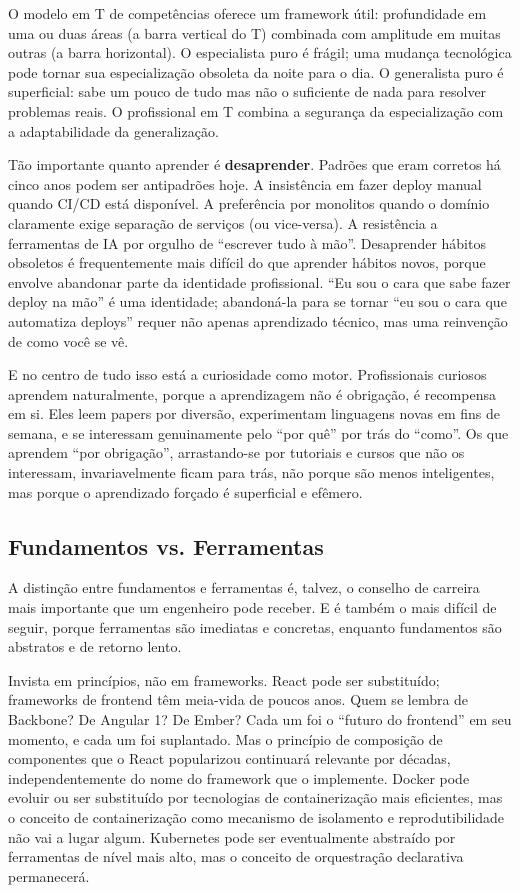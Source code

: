 O modelo em T de competências oferece um framework útil: profundidade
em uma ou duas áreas (a barra vertical do T) combinada com amplitude
em muitas outras (a barra horizontal). O especialista puro é frágil;
uma mudança tecnológica pode tornar sua especialização obsoleta da
noite para o dia. O generalista puro é superficial: sabe um pouco
de tudo mas não o suficiente de nada para resolver problemas reais. O
profissional em T combina a segurança da especialização com a
adaptabilidade da generalização.

Tão importante quanto aprender é \textbf{desaprender}. Padrões que
eram corretos há cinco anos podem ser antipadrões hoje. A insistência
em fazer deploy manual quando CI/CD está disponível. A preferência por
monolitos quando o domínio claramente exige separação de serviços (ou
vice-versa). A resistência a ferramentas de IA por orgulho de ``escrever
tudo à mão''. Desaprender hábitos obsoletos é frequentemente mais
difícil do que aprender hábitos novos, porque envolve abandonar parte
da identidade profissional. ``Eu sou o cara que sabe fazer deploy na
mão'' é uma identidade; abandoná-la para se tornar ``eu sou o cara que
automatiza deploys'' requer não apenas aprendizado técnico, mas uma
reinvenção de como você se vê.

E no centro de tudo isso está a curiosidade como motor. Profissionais
curiosos aprendem naturalmente, porque a aprendizagem não é obrigação,
é recompensa em si. Eles leem papers por diversão, experimentam
linguagens novas em fins de semana, e se interessam genuinamente pelo
``por quê'' por trás do ``como''. Os que aprendem ``por obrigação'',
arrastando-se por tutoriais e cursos que não os interessam,
invariavelmente ficam para trás, não porque são menos inteligentes,
mas porque o aprendizado forçado é superficial e efêmero.

\subsection{Fundamentos vs. Ferramentas}

A distinção entre fundamentos e ferramentas é, talvez, o conselho de
carreira mais importante que um engenheiro pode receber. E é também o
mais difícil de seguir, porque ferramentas são imediatas e concretas,
enquanto fundamentos são abstratos e de retorno lento.

Invista em princípios, não em frameworks. React pode ser substituído;
frameworks de frontend têm meia-vida de poucos anos. Quem
se lembra de Backbone? De Angular 1? De Ember? Cada um foi o ``futuro
do frontend'' em seu momento, e cada um foi suplantado. Mas o princípio
de composição de componentes que o React popularizou continuará
relevante por décadas, independentemente do nome do framework que o
implemente. Docker pode evoluir ou ser substituído por tecnologias de
containerização mais eficientes, mas o conceito de containerização como
mecanismo de isolamento e reprodutibilidade não vai a lugar algum.
Kubernetes pode ser eventualmente abstraído por ferramentas de nível
mais alto, mas o conceito de orquestração declarativa permanecerá.

